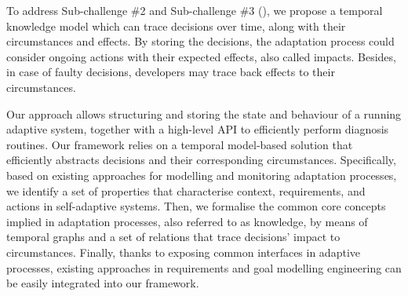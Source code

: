 


To address Sub-challenge \#2 and Sub-challenge \#3 (\cf {}), we propose a temporal knowledge \gls{model} which can trace decisions over time, along with their circumstances and effects.
By storing the \glspl{decision}, the adaptation process could consider ongoing \glspl{action} with their expected effects, also called impacts.
Besides, in case of faulty decisions, developers may trace back effects to their \glspl{circumstance}.

Our approach allows structuring and storing the state and behaviour of a running adaptive system, together with a high-level API to efficiently perform diagnosis routines. 
Our framework relies on a temporal model-based solution that efficiently abstracts decisions and their corresponding circumstances.
Specifically, based on existing approaches for modelling and monitoring adaptation processes, we identify a set of properties that characterise context, requirements, and actions in self-adaptive systems.    
Then, we formalise the common core concepts implied in adaptation processes, also referred to as knowledge, by means of temporal graphs and a set of relations that trace decisions' impact to circumstances.
Finally, thanks to exposing common interfaces in adaptive processes, existing approaches in requirements and goal modelling engineering can be easily integrated into our framework. 


